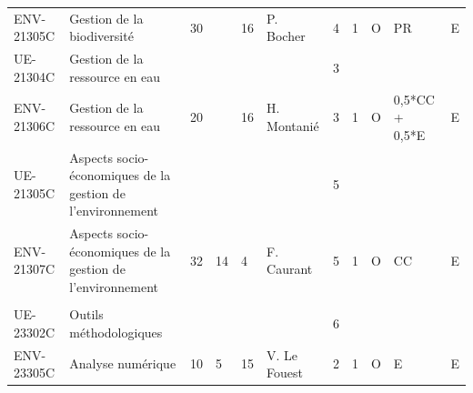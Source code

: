 \documentclass[a4paper,11pt]{article}
\begin{document}
{{\begin{tabular}{lllllllllll}
ENV-21305C                         & Gestion de la biodiversité                                             & 30 &    & 16                        & P. Bocher                          & 4    & 1    & O           & \cellcolor[HTML]{FD6864}PR             & E                         \\
\rowcolor[HTML]{EFEFEF} 
UE-21304C                          & Gestion de la ressource en eau                                         &    &    &                           &                                    & 3    &      &             &                                        &                           \\
ENV-21306C                         & Gestion de la ressource en eau                                         & 20 &    & 16                        & H. Montanié                        & 3    & 1    & O           & 0,5*CC + 0,5*E                         & E                         \\
\rowcolor[HTML]{EFEFEF} 
UE-21305C                          & Aspects socio-économiques de la gestion de l'environnement             &    &    &                           &                                    & 5    &      &             &                                        &                           \\
ENV-21307C                         & Aspects socio-économiques de la gestion de l'environnement             & 32 & 14 & 4                         & F. Caurant                         & 5    & 1    & O           & CC                                     & E                         \\
\rowcolor[HTML]{C0C0C0} 
\multicolumn{11}{c}{\cellcolor[HTML]{C0C0C0}\textit{Coloration Recherche}}                                                                                                                                                                                                              \\
\rowcolor[HTML]{EFEFEF} 
UE-23302C                          & Outils méthodologiques                                                 &    &    &                           &                                    & 6    &      &             &                                        &                           \\
ENV-23305C                         & Analyse numérique                                                      & 10 & 5  & 15                        & V. Le Fouest                       & 2    & 1    & O           & E                                      & E                         \\

\end{tabular}}}
\end{document}
